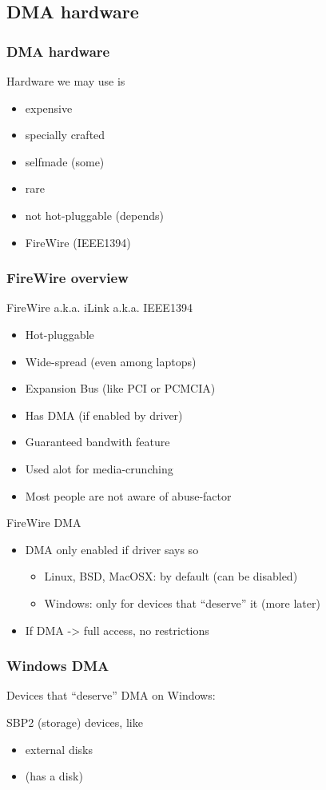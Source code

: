 \documentclass{beamer}
\newenvironment{itemizeframe}[1]
  {\begin{frame}{#1}\startitemizeframe}
  {\stopitemizeframe\end{frame}}
\newcommand\startitemizeframe{\begin{itemize}}
\newcommand\stopitemizeframe{\end{itemize}}
\begin{document}
	\subsection{DMA hardware}

		\begin{frame} \frametitle{DMA hardware}
			Hardware we may use is
			\begin{itemize}
				\item expensive
				\item specially crafted
				\item selfmade (some)
				\item rare
				\item not hot-pluggable (depends)
				\item {} FireWire (IEEE1394)
			\end{itemize}
		\end{frame}

		\begin{frame} \frametitle{FireWire overview}
			 FireWire a.k.a. iLink a.k.a. IEEE1394
			\begin{itemize}
				\item Hot-pluggable
				\item Wide-spread (even among laptops)
				\item Expansion Bus (like PCI or PCMCIA)
				\item Has DMA (if enabled by driver)
				\item Guaranteed bandwith feature
				\item Used alot for media-crunching
				\item Most people are not aware of abuse-factor
			\end{itemize}
		\end{frame}

		\begin{itemizeframe}{FireWire DMA}
			\item DMA only enabled if driver says so
			\begin{itemize}
				\item Linux, BSD, MacOSX: by default (can be disabled)
				\item Windows: only for devices that ``deserve'' it (more later)
			\end{itemize}
			\item If DMA -> full access, no restrictions
		\end{itemizeframe}

		\begin{frame} \frametitle{Windows DMA}
			Devices that ``deserve'' DMA on Windows:

			SBP2 (storage) devices, like
			\begin{itemize}
				\item external disks
				\item {} (has a disk)
			\end{itemize}

		\end{frame}
		
\end{document}
